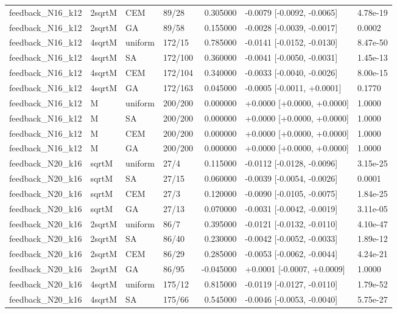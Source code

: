 \begin{tabular}{llllrll}
feedback\_N16\_k12 & 2sqrtM & CEM & 89/28 & 0.305000 & -0.0079 [-0.0092, -0.0065] & 4.78e-19 \\
feedback\_N16\_k12 & 2sqrtM & GA & 89/58 & 0.155000 & -0.0028 [-0.0039, -0.0017] & 0.0002 \\
feedback\_N16\_k12 & 4sqrtM & uniform & 172/15 & 0.785000 & -0.0141 [-0.0152, -0.0130] & 8.47e-50 \\
feedback\_N16\_k12 & 4sqrtM & SA & 172/100 & 0.360000 & -0.0041 [-0.0050, -0.0031] & 1.45e-13 \\
feedback\_N16\_k12 & 4sqrtM & CEM & 172/104 & 0.340000 & -0.0033 [-0.0040, -0.0026] & 8.00e-15 \\
feedback\_N16\_k12 & 4sqrtM & GA & 172/163 & 0.045000 & -0.0005 [-0.0011, +0.0001] & 0.1770 \\
feedback\_N16\_k12 & M & uniform & 200/200 & 0.000000 & +0.0000 [+0.0000, +0.0000] & 1.0000 \\
feedback\_N16\_k12 & M & SA & 200/200 & 0.000000 & +0.0000 [+0.0000, +0.0000] & 1.0000 \\
feedback\_N16\_k12 & M & CEM & 200/200 & 0.000000 & +0.0000 [+0.0000, +0.0000] & 1.0000 \\
feedback\_N16\_k12 & M & GA & 200/200 & 0.000000 & +0.0000 [+0.0000, +0.0000] & 1.0000 \\
feedback\_N20\_k16 & sqrtM & uniform & 27/4 & 0.115000 & -0.0112 [-0.0128, -0.0096] & 3.15e-25 \\
feedback\_N20\_k16 & sqrtM & SA & 27/15 & 0.060000 & -0.0039 [-0.0054, -0.0026] & 0.0001 \\
feedback\_N20\_k16 & sqrtM & CEM & 27/3 & 0.120000 & -0.0090 [-0.0105, -0.0075] & 1.84e-25 \\
feedback\_N20\_k16 & sqrtM & GA & 27/13 & 0.070000 & -0.0031 [-0.0042, -0.0019] & 3.11e-05 \\
feedback\_N20\_k16 & 2sqrtM & uniform & 86/7 & 0.395000 & -0.0121 [-0.0132, -0.0110] & 4.10e-47 \\
feedback\_N20\_k16 & 2sqrtM & SA & 86/40 & 0.230000 & -0.0042 [-0.0052, -0.0033] & 1.89e-12 \\
feedback\_N20\_k16 & 2sqrtM & CEM & 86/29 & 0.285000 & -0.0053 [-0.0062, -0.0044] & 4.24e-21 \\
feedback\_N20\_k16 & 2sqrtM & GA & 86/95 & -0.045000 & +0.0001 [-0.0007, +0.0009] & 1.0000 \\
feedback\_N20\_k16 & 4sqrtM & uniform & 175/12 & 0.815000 & -0.0119 [-0.0127, -0.0110] & 1.79e-52 \\
feedback\_N20\_k16 & 4sqrtM & SA & 175/66 & 0.545000 & -0.0046 [-0.0053, -0.0040] & 5.75e-27 \\

\end{tabular}
